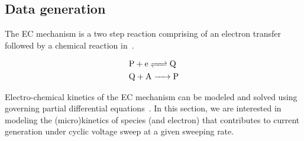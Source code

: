 \subsection{Data generation}\label{sec:data}
The EC mechanism is a two step reaction comprising of an electron transfer~ followed by a chemical reaction in~. 
\begin{chequation}
\begin{align}
    &\ce{P + e <=> Q} \label{E}\\
    &\ce{Q + A -> P } \label{C}
\end{align}
\end{chequation} 
Electro-chemical kinetics of the EC mechanism can be modeled and solved using governing partial differential equations~\cite{saveant1984homogeneous}. 
In this section, we are interested in modeling the (micro)kinetics of species (and electron) that contributes to current generation under cyclic voltage sweep at a given sweeping rate.

